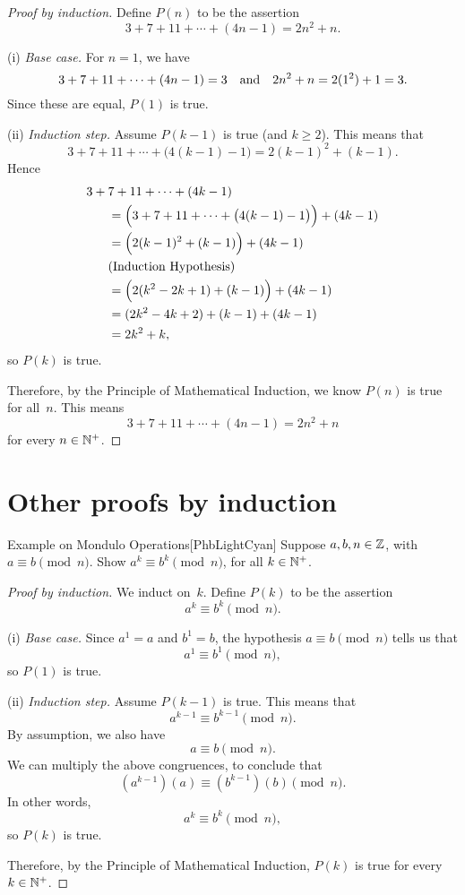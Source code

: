\documentclass[../MATH-2000-Notes.tex]{subfiles}
\begin{document}
\begin{proof}[Proof by induction]
    Define $P(n)$ to be the assertion
    $$ 3 + 7 + 11 + \cdots + (4n-1) = 2n^2 + n .$$

    (i) \emph{Base case.} For $n = 1$, we have
    $$3 + 7 + 11 + \cdots + (4n-1) = 3 \mbox{\quad and\quad}  2n^2 + n = 2(1^2) + 1 = 3.$$
    Since these are equal,
    $P(1)$ is true.

    \medbreak
    (ii) \emph{Induction step.} Assume $P(k-1)$ is true (and $k \ge 2$). This means that
    $$ 3 + 7 + 11 + \cdots + \bigl(4(k-1)-1 \bigr) = 2(k-1)^2 + (k-1) .$$
    Hence
    \begin{align*}
        3 +  {} & 7 + 11 + \cdots + (4k-1)
        \\&= \Bigl( 3 +  7 + 11 + \cdots + \bigl(4(k-1)-1\bigr) \Bigr) + (4k-1)
        \\&= \Bigl( 2(k-1)^2 + (k-1) \Bigr)  + (4k-1)
        \\& \text{(Induction Hypothesis)}
        \\&= \Bigl( 2(k^2 - 2k + 1) + (k-1) \Bigr)  + (4k-1)
        \\&= (2k^2 - 4k + 2) + (k-1)  + (4k-1)
        \\&= 2k^2 + k
        ,\end{align*}
    so $P(k)$ is true.

    \medbreak

    Therefore, by the Principle of Mathematical Induction, we know $P(n)$ is true for all~$n$. This means
    $$ 3 + 7 + 11 + \cdots + (4n-1) = 2n^2 + n $$
    for every $n \in \mathbb{N}^+$.
\end{proof}
\newpage
\section{Other proofs by induction}
\begin{commentbox}{Example on Mondulo Operations}[{PhbLightCyan}]
    Suppose $a,b,n \in \mathbb{Z}$, with $a \equiv b \pmod{n}$. Show
    $a^k \equiv b^k \pmod{n}$, for all $k \in \mathbb{N}^+$.
\end{commentbox}

\begin{proof}[Proof by induction]
    We induct on~$k$. Define $P(k)$ to be the assertion
    $$ a^k \equiv b^k \pmod{n}.$$

    (i) \emph{Base case.} Since $a^1 = a$ and $b^1 = b$, the hypothesis $a \equiv b \pmod{n}$ tells us that
    $$ a^1 \equiv b^1 \pmod{n} ,$$
    so $P(1)$ is true.

    (ii) \emph{Induction step.} Assume $P(k-1)$ is true.
    This means that
    $$a^{k-1} \equiv b^{k-1} \pmod{n} .$$
    By assumption, we also have
    $$ a \equiv b \pmod{n} .$$
    We can multiply the above congruences, to conclude that
    $$ (a^{k-1} )(a) \equiv ( b^{k-1}) (b) \pmod{n} .$$
    In other words,
    $$ a^k \equiv b^k \pmod{n} ,$$
    so $P(k)$ is true.

    \medskip
    Therefore, by the Principle of Mathematical Induction, $P(k)$ is true for every $k \in \mathbb{N}^+$.
\end{proof}
\end{document}
